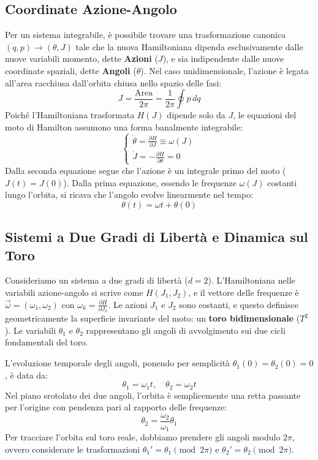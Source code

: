 \documentclass[12pt,a4paper]{article}
\begin{document}
\subsection{Coordinate Azione-Angolo}
Per un sistema integrabile, è possibile trovare una trasformazione canonica $(q, p) \to (\theta, J)$ tale che la nuova Hamiltoniana dipenda esclusivamente dalle nuove variabili momento, dette \textbf{Azioni} ($J$), e sia indipendente dalle nuove coordinate spaziali, dette \textbf{Angoli} ($\theta$).
Nel caso unidimensionale, l'azione è legata all'area racchiusa dall'orbita chiusa nello spazio delle fasi:
\begin{equation}
J = \frac{\text{Area}}{2\pi} = \frac{1}{2\pi} \oint p \, dq
\end{equation}
Poiché l'Hamiltoniana trasformata $H(J)$ dipende solo da $J$, le equazioni del moto di Hamilton assumono una forma banalmente integrabile:
\begin{equation}
\begin{cases}
\dot{\theta} = \frac{\partial H}{\partial J} \equiv \omega(J) \\
\dot{J} = -\frac{\partial H}{\partial \theta} = 0
\end{cases}
\end{equation}
Dalla seconda equazione segue che l'azione è un integrale primo del moto ($J(t) = J(0)$). Dalla prima equazione, essendo le frequenze $\omega(J)$ costanti lungo l'orbita, si ricava che l'angolo evolve linearmente nel tempo:
\begin{equation}
\theta(t) = \omega t + \theta(0)
\end{equation}

\subsection{Sistemi a Due Gradi di Libertà e Dinamica sul Toro}
Consideriamo un sistema a due gradi di libertà ($d=2$). L'Hamiltoniana nelle variabili azione-angolo si scrive come $H(J_1, J_2)$, e il vettore delle frequenze è $\vec{\omega} = (\omega_1, \omega_2)$ con $\omega_k = \frac{\partial H}{\partial J_k}$. 
Le azioni $J_1$ e $J_2$ sono costanti, e questo definisce geometricamente la superficie invariante del moto: un \textbf{toro bidimensionale} ($T^2$). Le variabili $\theta_1$ e $\theta_2$ rappresentano gli angoli di avvolgimento sui due cicli fondamentali del toro.

L'evoluzione temporale degli angoli, ponendo per semplicità $\theta_1(0) = \theta_2(0) = 0$, è data da:
\begin{equation}
\theta_1 = \omega_1 t, \quad \theta_2 = \omega_2 t
\end{equation}
Nel piano srotolato dei due angoli, l'orbita è semplicemente una retta passante per l'origine con pendenza pari al rapporto delle frequenze:
\begin{equation}
\theta_2 = \frac{\omega_2}{\omega_1} \theta_1
\end{equation}
Per tracciare l'orbita sul toro reale, dobbiamo prendere gli angoli modulo $2\pi$, ovvero considerare le trasformazioni $\theta_1' = \theta_1 \pmod{2\pi}$ e $\theta_2' = \theta_2 \pmod{2\pi}$.
\end{document}
